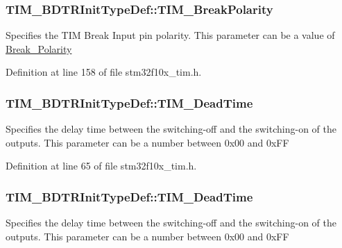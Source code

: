 \subsubsection[{\texorpdfstring{T\+I\+M\+\_\+\+Break\+Polarity}{TIM_BreakPolarity}}]{ T\+I\+M\+\_\+\+B\+D\+T\+R\+Init\+Type\+Def\+::\+T\+I\+M\+\_\+\+Break\+Polarity}\hypertarget{struct_t_i_m___b_d_t_r_init_type_def_a5731e4e786b66f35cfe4798d6157619e}{}\label{struct_t_i_m___b_d_t_r_init_type_def_a5731e4e786b66f35cfe4798d6157619e}
Specifies the T\+IM Break Input pin polarity. This parameter can be a value of \hyperlink{group___break___polarity}{Break\+\_\+\+Polarity} 

Definition at line 158 of file stm32f10x\+\_\+tim.\+h.

\subsubsection[{\texorpdfstring{T\+I\+M\+\_\+\+Dead\+Time}{TIM_DeadTime}}]{ T\+I\+M\+\_\+\+B\+D\+T\+R\+Init\+Type\+Def\+::\+T\+I\+M\+\_\+\+Dead\+Time}\hypertarget{struct_t_i_m___b_d_t_r_init_type_def_acd52c40b41fe01d7558e1bf57e99887b}{}\label{struct_t_i_m___b_d_t_r_init_type_def_acd52c40b41fe01d7558e1bf57e99887b}
Specifies the delay time between the switching-\/off and the switching-\/on of the outputs. This parameter can be a number between 0x00 and 0x\+FF 

Definition at line 65 of file stm32f10x\+\_\+tim.\+h.

\subsubsection[{\texorpdfstring{T\+I\+M\+\_\+\+Dead\+Time}{TIM_DeadTime}}]{ T\+I\+M\+\_\+\+B\+D\+T\+R\+Init\+Type\+Def\+::\+T\+I\+M\+\_\+\+Dead\+Time}\hypertarget{struct_t_i_m___b_d_t_r_init_type_def_a01ccbaffccdb3068b8a60c912579b1a2}{}\label{struct_t_i_m___b_d_t_r_init_type_def_a01ccbaffccdb3068b8a60c912579b1a2}
Specifies the delay time between the switching-\/off and the switching-\/on of the outputs. This parameter can be a number between 0x00 and 0x\+FF 

